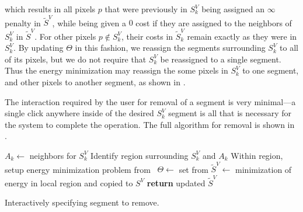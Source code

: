 \documentclass[]{spie}  %
\begin{document}

which results in all pixels $p$ that were previously in $S^V_k$ being
assigned an $\infty$ penalty in $\tilde{S}^V$, while being given a $0$
cost if they are assigned to the neighbors of $S^V_k$ in
$\tilde{S}^V$.  For other pixels $p\notin S^V_k$, their costs in
$\tilde{S}^V_k$ remain exactly as they were in $S^V_k$.  By updating
$\Theta$ in this fashion, we reassign the segments surrounding $S^V_k$
to all of its pixels, but we do not require that $S^V_k$ be reassigned
to a single segment.  Thus the energy minimization may reassign the
some pixels in $S^V_k$ to one segment, and other pixels to another
segment, as shown in .

The interaction required by the user for removal of a segment is very
minimal---a single click anywhere inside of the desired $S^V_k$
segment is all that is necessary for the system to complete the
operation.  The full algorithm for removal is shown in .

\begin{algorithm}[!t]
  \centering
  \algrenewcommand{}
  \begin{algorithmic}[1]
    \State $A_k \gets$ neighbors for $S^V_k$
    \State Identify region surrounding $S^V_k$ and $A_k$
    \State Within region, setup energy minimization problem from~\cite{waggoner:11}
    \State $\Theta \gets $ set from 
    \State $ \tilde{S}^V \gets $ minimization of energy in local region and copied to $S^V$
    \State \textbf{return} updated $\tilde{S}^V$
    \EndFunction
  \end{algorithmic}
  \caption{Interactively specifying segment to remove.}
  \label{alg:remove}
\end{algorithm}
\end{document}
